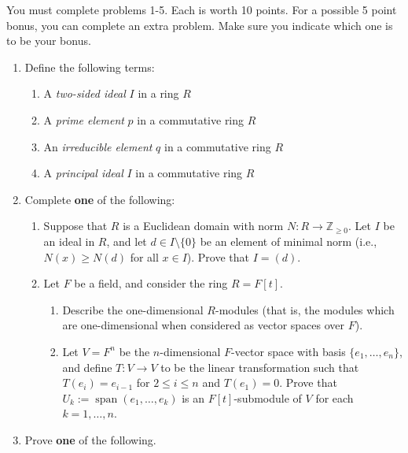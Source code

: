 \documentclass[12pt]{article}
\newcommand{\bbR}{\mathbb{R}}
\newcommand{\bbZ}{\mathbb{Z}}
\begin{document}
\pagestyle{fancy}

You must complete problems 1-5. Each is worth 10 points. For a
possible 5 point bonus, you can complete an extra problem. Make sure
you indicate which one is to be your bonus. 
\begin{enumerate}
\item Define the following terms:
  \begin{enumerate}
  \item A \emph{two-sided ideal} $I$ in a ring $R$
  \item A \emph{prime element} $p$ in a commutative ring $R$
  \item An \emph{irreducible element} $q$ in a commutative ring $R$ 
  \item A \emph{principal ideal} $I$ in a commutative ring $R$
  \end{enumerate}
\item Complete {\bf one} of the following: 
\begin{enumerate} 
\item Suppose that $R$ is a Euclidean domain with norm $N: R\rightarrow
\bbZ_{\geq 0}$. Let $I$ be an ideal in $R$, and let $d\in I\setminus \{0\}$ be
  an element of minimal norm (i.e., $N(x)\geq N(d)$ for all $x\in
  I$). Prove that $I=(d)$. 
\item Let $F$ be a field, and consider the ring $R=F[t]$. 
  \begin{enumerate}
  \item Describe the one-dimensional $R$-modules (that is, the modules
    which are one-dimensional when considered as vector spaces over
    $F$).
  \item Let $V=F^n$ be the $n$-dimensional $F$-vector space with basis
    $\{e_1,\dotsc, e_n\}$, and define $T:V\rightarrow V$ to be the
    linear transformation such that $T(e_i) =
  e_{i-1}$ for $2\leq i \leq n$ and $T(e_1)=0$. Prove that
  $U_k:=\operatorname{span}(e_1,\dotsc, e_k)$ is an $F[t]$-submodule
  of $V$ for each $k=1,\dotsc, n$. 
\end{enumerate}
\end{enumerate}
\item Prove {\bf one} of the following. 

\end{enumerate}
\end{document}
